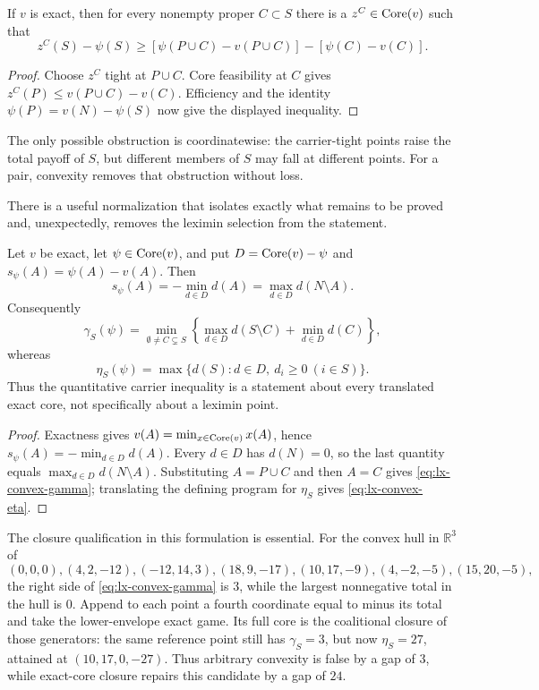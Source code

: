 \begin{lemma}
\label{lem:lx-carrier-lift}
If $v$ is exact, then for every nonempty proper $C\subset S$ there is a
$z^C\in\operatorname{Core}(v)$ such that
\[
 z^C(S)-\psi(S)\geq
 [\psi(P\cup C)-v(P\cup C)]-[\psi(C)-v(C)].
\]
\end{lemma}

\begin{proof}
Choose $z^C$ tight at $P\cup C$.  Core feasibility at $C$ gives
$z^C(P)\leq v(P\cup C)-v(C)$.  Efficiency and the identity
$\psi(P)=v(N)-\psi(S)$ now give the displayed inequality.
\end{proof}

The only possible obstruction is coordinatewise: the carrier-tight points
raise the total payoff of $S$, but different members of $S$ may fall at
different points.  For a pair, convexity removes that obstruction without
loss.

There is a useful normalization that isolates exactly what remains to be
proved and, unexpectedly, removes the leximin selection from the statement.

\begin{proposition}
\label{prop:lx-exact-core-closure}
Let $v$ be exact, let $\psi\in\operatorname{Core}(v)$, and put
$D=\operatorname{Core}(v)-\psi$ and $s_\psi(A)=\psi(A)-v(A)$.  Then
\[
 s_\psi(A)=-\min_{d\in D}d(A)=\max_{d\in D}d(N\setminus A).
 \tag{EC}\label{eq:lx-exact-core-support}
\]
Consequently
\[
 \gamma_S(\psi)=
 \min_{\emptyset\ne C\subsetneq S}
 \left\{\max_{d\in D}d(S\setminus C)+\min_{d\in D}d(C)\right\},
 \tag{CG}\label{eq:lx-convex-gamma}
\]
whereas
\[
 \eta_S(\psi)=\max\{d(S):d\in D,\ d_i\geq0\ (i\in S)\}.
 \tag{CE}\label{eq:lx-convex-eta}
\]
Thus the quantitative carrier inequality is a statement about every
translated exact core, not specifically about a leximin point.
\end{proposition}

\begin{proof}
Exactness gives $v(A)=\min_{x\in\operatorname{Core}(v)}x(A)$, hence
$s_\psi(A)=-\min_{d\in D}d(A)$.  Every $d\in D$ has $d(N)=0$, so the last
quantity equals $\max_{d\in D}d(N\setminus A)$.  Substituting
$A=P\cup C$ and then $A=C$ gives \eqref{eq:lx-convex-gamma}; translating
the defining program for $\eta_S$ gives \eqref{eq:lx-convex-eta}.
\end{proof}

The closure qualification in this formulation is essential.  For the convex
hull in $\mathbb R^3$ of
\[
 (0,0,0),(4,2,-12),(-12,14,3),(18,9,-17),
 (10,17,-9),(4,-2,-5),(15,20,-5),
\]
the right side of \eqref{eq:lx-convex-gamma} is $3$, while the largest
nonnegative total in the hull is $0$.  Append to each point a fourth
coordinate equal to minus its total and take the lower-envelope exact game.
Its full core is the coalitional closure of those generators: the same
reference point still has $\gamma_S=3$, but now $\eta_S=27$, attained at
$(10,17,0,-27)$.  Thus arbitrary convexity is false by a gap of $3$, while
exact-core closure repairs this candidate by a gap of $24$.

